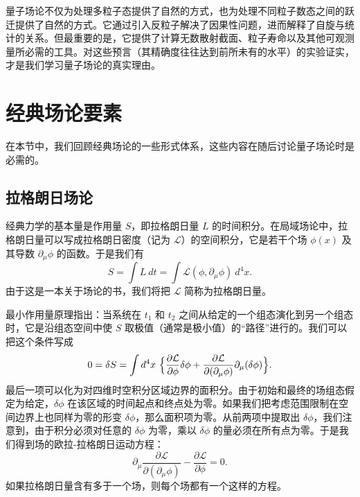 量子场论不仅为处理多粒子态提供了自然的方式，也为处理不同粒子数态之间的跃迁提供了自然的方式。它通过引入反粒子解决了因果性问题，进而解释了自旋与统计的关系。但最重要的是，它提供了计算无数散射截面、粒子寿命以及其他可观测量所必需的工具。对这些预言（其精确度往往达到前所未有的水平）的实验证实，才是我们学习量子场论的真实理由。

\section{经典场论要素}

在本节中，我们回顾经典场论的一些形式体系，这些内容在随后讨论量子场论时是必需的。

\subsection*{拉格朗日场论}

经典力学的基本量是作用量 $S$，即拉格朗日量 $L$ 的时间积分。在局域场论中，拉格朗日量可以写成拉格朗日密度（记为 $\mathcal{L}$）的空间积分，它是若干个场 $\phi(x)$ 及其导数 $\partial_\mu\phi$ 的函数。于是我们有
\begin{equation}
  S = \int L\ dt = \int \mathcal{L}(\phi, \partial_\mu\phi)\ d^4x .
  \label{eq:2.1}
\end{equation}
由于这是一本关于场论的书，我们将把 $\mathcal{L}$ 简称为拉格朗日量。

最小作用量原理指出：当系统在 $t_1$ 和 $t_2$ 之间从给定的一个组态演化到另一个组态时，它是沿组态空间中使 $S$ 取极值（通常是极小值）的``路径''进行的。我们可以把这个条件写成
\begin{equation}
  0 = \delta S = \int d^4x\ \Bigl\{
    \frac{\partial\mathcal{L}}{\partial\phi}\delta\phi
    + \frac{\partial\mathcal{L}}{\partial(\partial_\mu\phi)}
      \partial_\mu(\delta\phi) \Bigr\}.
  \label{eq:2.2}
\end{equation}
最后一项可以化为对四维时空积分区域边界的面积分。由于初始和最终的场组态假定为给定，$\delta\phi$ 在该区域的时间起点和终点处为零。如果我们把考虑范围限制在空间边界上也同样为零的形变 $\delta\phi$，那么面积项为零。从前两项中提取出 $\delta\phi$，我们注意到，由于积分必须对任意的 $\delta\phi$ 为零，乘以 $\delta\phi$ 的量必须在所有点为零。于是我们得到场的欧拉-拉格朗日运动方程：
\begin{equation}
  \partial_\mu \frac{\partial\mathcal{L}}{\partial(\partial_\mu\phi)}
  - \frac{\partial\mathcal{L}}{\partial\phi} = 0 .
  \label{eq:2.3}
\end{equation}
如果拉格朗日量含有多于一个场，则每个场都有一个这样的方程。

